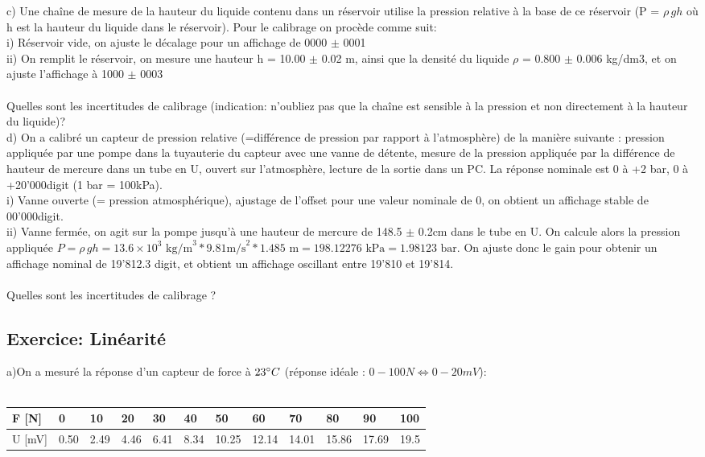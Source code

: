 c)	Une chaîne de mesure de la hauteur du liquide contenu dans un réservoir utilise la pression relative à la base de ce réservoir (P = $\rho\,gh$ où h est la hauteur du liquide dans le réservoir). Pour le calibrage on procède comme suit: \\
i)	Réservoir vide, on ajuste le décalage pour un affichage de 0000  $\pm$  0001 \\
ii)	On remplit le réservoir, on mesure une hauteur h = 10.00 $\pm$ 0.02 m, ainsi que la densité du liquide  $\rho$ = 0.800  $\pm$  0.006 kg/dm3, et on ajuste l'affichage à 1000  $\pm$  0003 \\ ~ \\
Quelles sont les incertitudes de calibrage (indication: n'oubliez pas que la chaîne est sensible à la pression et non directement à la hauteur du liquide)? \\

d)	On a calibré un capteur de pression relative (=différence de pression par rapport à l'atmosphère) de la manière suivante : pression appliquée par une pompe dans la tuyauterie du capteur avec une vanne de détente, mesure de la pression appliquée par la différence de hauteur de mercure dans un tube en U, ouvert sur l'atmosphère, lecture de la sortie dans un PC. La réponse nominale est 0 à +2 bar, 0 à +20'000digit (1 bar = 100kPa). \\
i)	Vanne ouverte (= pression atmosphérique), ajustage de l'offset pour une valeur nominale de 0, on obtient un affichage stable de 00'000digit. \\
ii)	Vanne fermée, on agit sur la pompe jusqu'à une hauteur de mercure de 148.5 $\pm$ 0.2cm dans le tube en U. On calcule alors la pression appliquée $P=\rho\,gh = 13.6\times10^3 \text{ kg/m}^3 * 9.81\text {m/s}^2 * 1.485\text{ m}=198.12276\text{ kPa} = 1.98123\text{ bar}$. On ajuste donc le gain pour obtenir un affichage nominal de 19'812.3 digit, et obtient un affichage oscillant entre 19'810 et 19'814. \\ ~\\
Quelles sont les incertitudes de calibrage ?

\subsection{Exercice: Linéarité}

a)On a mesuré la réponse d'un capteur de force à $23 \degree C$ (réponse idéale : $0-100N \Leftrightarrow 0-20 mV$):\\
~
\\
\begin{tabular}{|l|l|l|l|l|l|l|l|l|l|l|l|}
    \hline
    F [N]  & 0    & 10   & 20   & 30   & 40   & 50    & 60    & 70    & 80    & 90    & 100  \\
    \hline
    U [mV] & 0.50 & 2.49 & 4.46 & 6.41 & 8.34 & 10.25 & 12.14 & 14.01 & 15.86 & 17.69 & 19.5 \\
    \hline
\end{tabular}
\\

